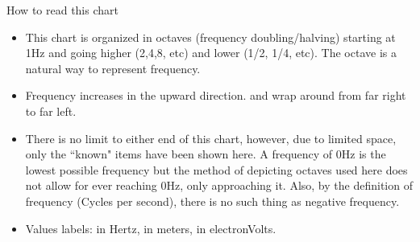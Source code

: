 {
{\Large How to read this chart}
\begin{itemize}

\item This chart is organized in octaves (frequency doubling/halving) starting at 1Hz and going higher (2,4,8, etc) and lower (1/2, 1/4, etc). The octave is a natural way to represent frequency.

\item Frequency increases in the upward direction. and wrap around from far right to far left.


\item There is no limit to either end of this chart, however, due to limited space, only the ``known" items have been shown here. A frequency of 0Hz is the lowest possible frequency but the method of depicting octaves used here does not allow for ever reaching 0Hz, only approaching it. Also, by the definition of frequency (Cycles per second), there is no such thing as negative frequency.

\item Values labels: \psframebox[framesep=1pt,fillstyle=solid,fillcolor=Black]{\textcolor{FColor}{Frequency}} in Hertz,%
\psframebox[framesep=1pt,fillstyle=solid,fillcolor=Black]{\textcolor{WColor}{Wavelength}} in meters,%
\psframebox[framesep=1pt,fillstyle=solid,fillcolor=Black]{\textcolor{EColor}{Energy}} in electronVolts.

\end{itemize}
}
